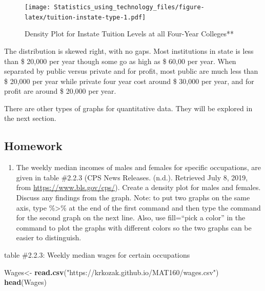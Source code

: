 \documentclass[]{book}
\newenvironment{Shaded}{\begin{snugshade}}{\end{snugshade}}
\newcommand{\KeywordTok}[1]{\textcolor[rgb]{0.13,0.29,0.53}{\textbf{#1}}}
\newcommand{\NormalTok}[1]{#1}
\newcommand{\StringTok}[1]{\textcolor[rgb]{0.31,0.60,0.02}{#1}}
\providecommand{\tightlist}{%
  \setlength{\itemsep}{0pt}\setlength{\parskip}{0pt}}
\begin{document}
\begin{figure}
\centering
\texttt{[image: Statistics\_using\_technology\_files/figure-latex/tuition-instate-type-1.pdf]}
\caption{\label{fig:tuition-instate-type}Density Plot for Instate Tuition Levels at all Four-Year Colleges**}
\end{figure}

The distribution is skewed right, with no gaps. Most institutions in state is less than \$ 20,000 per year though some go as high as \$ 60,00 per year. When separated by public versus private and for profit, most public are much less than \$ 20,000 per year while private four year cost around \$ 30,000 per year, and for profit are around \$ 20,000 per year.

There are other types of graphs for quantitative data. They will be
explored in the next section.

\hypertarget{homework-5}{%
\subsection{Homework}\label{homework-5}}

\begin{enumerate}
\def\labelenumi{\arabic{enumi}.}
\tightlist
\item
  The weekly median incomes of males and females for specific occupations, are given in table \#2.2.3 (CPS News Releases. (n.d.). Retrieved July 8, 2019, from \url{https://www.bls.gov/cps/}). Create a density plot for males and females. Discuss any findings from the graph. Note: to put two graphs on the same axis, type \%\textgreater{}\% at the end of the first command and then type the command for the second graph on the next line. Also, use fill=``pick a color'' in the command to plot the graphs with different colors so the two graphs can be easier to distinguish.
\end{enumerate}

table \#2.2.3: Weekly median wages for certain occupations

\begin{Shaded}
\begin{Highlighting}[]
\NormalTok{Wages<-}\StringTok{ }\KeywordTok{read.csv}\NormalTok{(}\StringTok{"https://krkozak.github.io/MAT160/wages.csv"}\NormalTok{)}
\KeywordTok{head}\NormalTok{(Wages)}
\end{Highlighting}
\end{Shaded}
\end{document}
